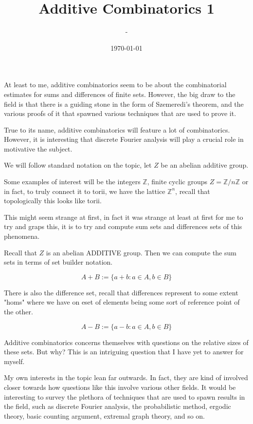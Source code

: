 \documentclass[12pt]{article}
\title{Additive Combinatorics 1}
\author{-}
\date{\today}
\begin{document}
\maketitle

At least to me, additive combinatorics seem to be about the combinatorial estimates for sums and differences of finite sets. However, the big draw to the field is that there is a guiding stone in the form of Szemeredi's theorem, and the various proofs of it that spawned various techniques that are used to prove it.

True to its name, additive combinatorics will feature a lot of combinatorics. However, it is interesting that discrete Fourier analysis will play a crucial role in motivative the subject.

We will follow standard notation on the topic, let $Z$ be an abelian additive group.

Some examples of interest will be the integers $\mathbb{Z}$, finite cyclic groups $Z = \mathbb{Z}/n\mathbb{Z}$ or in fact, to truly connect it to torii, we have the lattice $\mathbb{Z}^n$, recall that topologically this looks like torii.

This might seem strange at first, in fact it was strange at least at first for me to try and graps this, it is to try and compute sum sets and differences sets of this phenomena.

Recall that $Z$ is an abelian ADDITIVE group. Then we can compute the sum sets in terms of set builder notation.

\[A + B := \{a + b : a \in A, b \in B\}\]

There is also the difference set, recall that differences represent to some extent "homs" where we have on eset of elements being some sort of reference point of the other.

\[A - B := \{a - b : a \in A, b \in B\}\]

Additive combinatorics concerns themselves with questions on the relative sizes of these sets. But why? This is an intriguing question that I have yet to answer for myself.

My own interests in the topic lean far outwards. In fact, they are kind of involved closer towards how questions like this involve various other fields. It would be interesting to survey the plethora of techniques that are used to spawn results in the field, such as discrete Fourier analysis, the probabilistic method, ergodic theory, basic counting argument, extremal graph theory, and so on.
\end{document}
